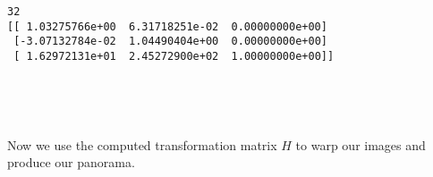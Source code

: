 \documentclass[11pt]{article}
\begin{document}
    \begin{Verbatim}[commandchars=\\\{\}]
32
[[ 1.03275766e+00  6.31718251e-02  0.00000000e+00]
 [-3.07132784e-02  1.04490404e+00  0.00000000e+00]
 [ 1.62972131e+01  2.45272900e+02  1.00000000e+00]]

    \end{Verbatim}

    \begin{center}
    \end{center}
    { \hspace*{\fill} \\}
    
    \begin{center}
    \end{center}
    { \hspace*{\fill} \\}
    
    Now we use the computed transformation matrix \(H\) to warp our images
and produce our panorama.
\end{document}

